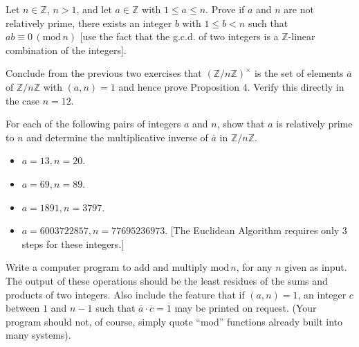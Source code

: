 \documentclass[12pt]{article}
\newenvironment{problem}[2][Exercise]{\begin{trivlist}
\item[\hskip \labelsep {\bfseries #1}\hskip \labelsep {\bfseries #2.}]}{\end{trivlist}}
\begin{document}
\begin{problem}{0.3.13}
Let $n\in \mathbb{Z}$, $n>1$, and let $a\in \mathbb{Z}$ with $1\leq a \leq n$. Prove if $a$ and $n$ are not relatively prime, there exists an integer $b$ with $1 \leq b < n$ such that $ab \equiv 0 \, \left(\text{mod} \, n\right)$ [use the fact that the g.c.d. of two integers is a $\mathbb{Z}$-linear combination of the integers].
\end{problem}




\begin{problem}{0.3.14}
Conclude from the previous two exercises that $\left(\mathbb{Z}/n\mathbb{Z}\right)^{\times}$ is the set of elements $\overline{a}$ of $\mathbb{Z}/n\mathbb{Z}$ with $\left(a,n\right)=1$ and hence prove Proposition 4. Verify this directly in the case $n=12$.
\end{problem}



\begin{problem}{0.3.15}
For each of the following pairs of integers $a$ and $n$, show that $a$ is relatively prime to $n$ and determine the multiplicative inverse of $\overline{a}$ in $\mathbb{Z}/n\mathbb{Z}$.
\begin{itemize}
    \item $a=13,n=20$.
    \item $a=69,n=89$.
    \item $a=1891,n=3797$.
    \item $a=6003722857,n=77695236973$. [The Euclidean Algorithm requires only $3$ steps for these integers.]
\end{itemize}
\end{problem}



\begin{problem}{0.3.16}
Write a computer program to add and multiply $\text{mod}\, n$, for any $n$ given as input. The output of these operations should be the least residues of the sums and products of two integers. Also include the feature that if $\left(a,n\right)=1$, an integer $c$ between $1$ and $n-1$ such that $\overline{a}\cdot \overline{c} = \overline{1}$ may be printed on request. (Your program should not, of course, simply quote ``mod'' functions already built into many systems).
\end{problem}
\end{document}
